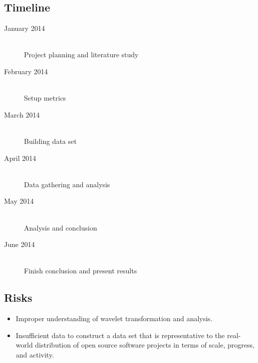 \subsection{Timeline}
\begin{description}
	\item[January 2014] \hfill \\ Project planning and literature study
	\item[February 2014] \hfill \\ Setup metrics
	\item[March 2014] \hfill \\ Building data set
	\item[April 2014] \hfill \\ Data gathering and analysis
	\item[May 2014] \hfill \\ Analysis and conclusion
	\item[June 2014] \hfill \\ Finish conclusion and present results
\end{description}

\subsection{Risks}
\begin{itemize}
	\item Improper understanding of wavelet transformation and analysis.
	\item Insufficient data to construct a data set that is representative to the
			real-world distribution of open source software projects in terms of scale,
			progress, and activity.
\end{itemize}